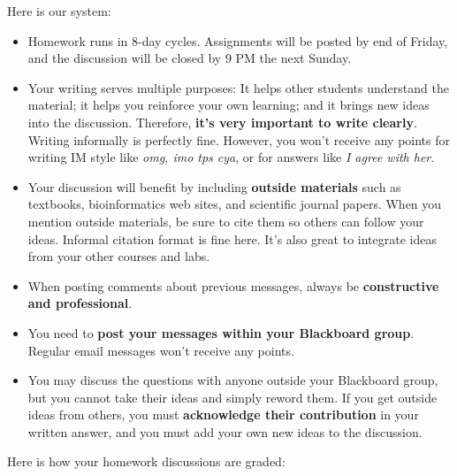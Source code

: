 \documentclass[12pt]{article}
\begin{document}
Here is our system:
  \begin{itemize}
  \item Homework runs in 8-day cycles.  Assignments will be posted
    by end of Friday, and the discussion will be closed by 9 PM
    the next Sunday.

  \item Your writing serves multiple purposes: It helps other students
    understand the material; it helps you reinforce your own learning;
    and it brings new ideas into the discussion.  Therefore,
    \textbf{it's very important to write clearly}.  Writing informally
    is perfectly fine.  However, you won't receive any points for writing IM
    style like \textit{omg, imo tps cya}, or for answers like
    \textit{I agree with her}.

  \item Your discussion will benefit by including \textbf{outside materials}
    such as textbooks, bioinformatics web sites, and scientific
    journal papers.  When you mention outside materials, be sure to
    cite them so others can follow your ideas.  Informal citation
    format is fine here.  It's also great to integrate ideas from your
    other courses and labs.


  \item When posting comments about previous messages, always be
    \textbf{constructive and professional}.

  \item You need to \textbf{post your messages within your Blackboard
      group}.  Regular email messages won't receive any points.

  \item You may discuss the questions with anyone outside your
    Blackboard group, but you cannot take their ideas and simply
    reword them.  If you get outside ideas from others, you must
    \textbf{acknowledge their contribution} in your written answer,
    and you must add your own new ideas to the discussion.
  \end{itemize}

  Here is how your homework discussions are graded:
\end{document}
